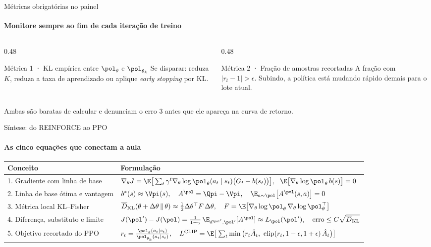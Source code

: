 \documentclass[aspectratio=169, 11pt]{beamer}
\newcommand{\Ahat}{\hat{A}}
\newcommand{\KLbar}{\overline{D}_{\mathrm{KL}}}
\DeclareMathOperator{\clipop}{clip}
\begin{document}
\begin{frame}{Métricas obrigatórias no painel}
  \framesubtitle{Monitore sempre ao fim de cada iteração de treino}

  \begin{columns}[T]
    \begin{column}{0.48\textwidth}
      \begin{teobox}{Métrica 1 · KL empírica entre $\pol_\theta$ e $\pol_{\theta_k}$}
        \small Se disparar: reduza $K$, reduza a taxa de aprendizado ou aplique
        \emph{early stopping} por KL.
      \end{teobox}
    \end{column}
    \begin{column}{0.48\textwidth}
      \begin{teobox}{Métrica 2 · Fração de amostras recortadas}
        \small A fração com $|r_t - 1| > \epsilon$. Subindo, a política está mudando rápido
        demais para o lote atual.
      \end{teobox}
    \end{column}
  \end{columns}

  \begin{ideiabox}
    Ambas são baratas de calcular e denunciam o erro 3 antes que ele apareça na curva de retorno.
  \end{ideiabox}
\end{frame}

\begin{frame}{Síntese: do REINFORCE ao PPO}
  \framesubtitle{As cinco equações que conectam a aula}
  \small
  \begin{tabular}{@{}p{}l@{}}
    \toprule
    \textbf{Conceito} & \textbf{Formulação} \\
    \midrule
    1. Gradiente com linha de base &
      $\nabla_\theta J = \E\big[\sum_t\gamma^t\nabla_\theta\log\pol_\theta(a_t\mid s_t)\big(G_t-b(s_t)\big)\big],\ \
       \E\big[\nabla_\theta\log\pol_\theta\, b(s)\big]=0$ \\[0.5em]
    2. Linha de base ótima e vantagem &
      $b^*(s)\approx\Vpi(s),\quad A^{\pol} = \Qpi - \Vpi,\quad \E_{a\sim\pol}\big[A^{\pol}(s,a)\big] = 0$ \\[0.5em]
    3. Métrica local KL--Fisher &
      $\KLbar(\theta+\Delta\theta\,\|\,\theta)\approx\tfrac12\Delta\theta^\top F\,\Delta\theta,\quad
       F = \E\big[\nabla_\theta\log\pol_\theta\,\nabla_\theta\log\pol_\theta^\top\big]$ \\[0.5em]
    4. Diferença, substituto e limite &
      $J(\pol')-J(\pol) = \tfrac{1}{1-\gamma}\,\E_{d^{\pol'},\pol'}[A^{\pol}]\approx L_{\pol}(\pol'),\quad
       \text{erro}\le C\sqrt{\KLbar}$ \\[0.5em]
    5. Objetivo recortado do PPO &
      $r_t = \frac{\pol_\theta(a_t\mid s_t)}{\pol_{\theta_k}(a_t\mid s_t)},\quad
       L^{\mathrm{CLIP}} = \E\big[\sum_t\min\big(r_t\Ahat_t,\ \clipop(r_t,1-\epsilon,1+\epsilon)\,\Ahat_t\big)\big]$ \\
    \bottomrule
  \end{tabular}
\end{frame}
\end{document}
